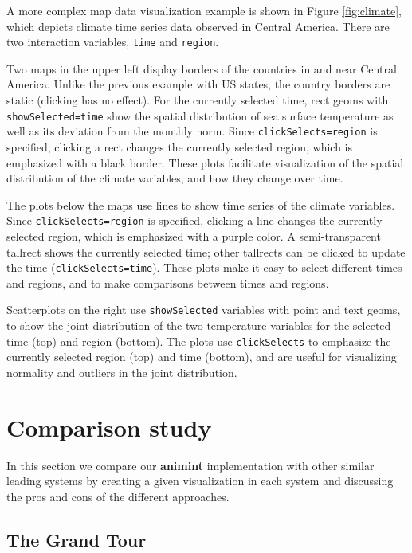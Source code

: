 \documentclass[12pt,]{article}
\theoremstyle{definition}
\theoremstyle{definition}
\theoremstyle{definition}
\theoremstyle{remark}
\begin{document}
A more complex map data visualization example is shown in Figure
\ref{fig:climate}, which depicts climate time series data observed in
Central America. There are two interaction variables, \texttt{time} and
\texttt{region}.

Two maps in the upper left display borders of the countries in and near
Central America. Unlike the previous example with US states, the country
borders are static (clicking has no effect). For the currently selected
time, rect geoms with \texttt{showSelected=time} show the spatial
distribution of sea surface temperature as well as its deviation from
the monthly norm. Since \texttt{clickSelects=region} is specified,
clicking a rect changes the currently selected region, which is
emphasized with a black border. These plots facilitate visualization of
the spatial distribution of the climate variables, and how they change
over time.

The plots below the maps use lines to show time series of the climate
variables. Since \texttt{clickSelects=region} is specified, clicking a
line changes the currently selected region, which is emphasized with a
purple color. A semi-transparent tallrect shows the currently selected
time; other tallrects can be clicked to update the time
(\texttt{clickSelects=time}). These plots make it easy to select
different times and regions, and to make comparisons between times and
regions.

Scatterplots on the right use \texttt{showSelected} variables with point
and text geoms, to show the joint distribution of the two temperature
variables for the selected time (top) and region (bottom). The plots use
\texttt{clickSelects} to emphasize the currently selected region (top)
and time (bottom), and are useful for visualizing normality and outliers
in the joint distribution.

\hypertarget{compare}{%
\section{Comparison study}\label{compare}}

In this section we compare our \textbf{animint} implementation with
other similar leading systems by creating a given visualization in each
system and discussing the pros and cons of the different approaches.

\hypertarget{tour}{%
\subsection{The Grand Tour}\label{tour}}
\end{document}
